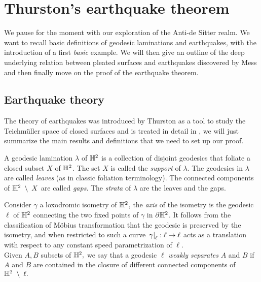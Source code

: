 \chapter{Thurston's earthquake theorem}

We pause for the moment with our exploration of the Anti-de Sitter realm. We want to recall basic definitions of geodesic laminations and earthquakes, with the introduction of a first \textit{basic} example. We will then give an outline of the deep underlying relation between pleated surfaces and earthquakes discovered by Mess and then finally move on the proof of the earthquake theorem. 


\section{Earthquake theory}
The theory of earthquakes was introduced by Thurston as a tool to study the Teichmüller space of closed surfaces and is treated in detail in \cite{kapovich2001hyperbolic}, we will just summarize the main results and definitions that we need to set up our proof. 

\begin{definition}
    A geodesic lamination $\lambda$ of $\mathbb{H}^2$ is a collection of disjoint geodesics that foliate a closed subset $X$ of $\mathbb{H}^2$. The set $X$ is called the \textit{support} of $\lambda.$ The geodesics in $\lambda$ are called \textit{leaves} (as in classic foliation terminology). The connected components of $\mathbb{H}^2\;\setminus\;X$ are called \textit{gaps}. The \textit{strata} of $\lambda$ are the leaves and the gaps.
\end{definition}

\noindent Consider $\gamma$ a loxodromic isometry of $\mathbb{H}^2$, the \textit{axis} of the isometry is the geodesic $\ell$ of $\mathbb{H}^2$ connecting the two fixed points of $\gamma$ in $\partial\mathbb{H}^2$. It follows from the classification of Möbius transformation that the geodesic is preserved by the isometry, and when restricted to such a curve $\left.\gamma\right|_{\ell}:\ell\to\ell$ acts as a translation with respect to any constant speed parametrization of $\ell$.\\
Given $A,B$ subsets of $\mathbb{H}^2,$ we say that a geodesic $\ell$ \textit{weakly separates} $A$ and $B$ if $A$ and $B$ are contained in the closure of different connected components of $\mathbb{H}^2\;\setminus\;\ell.$ 

